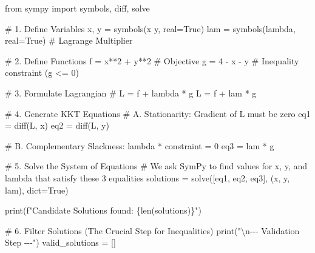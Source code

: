 \documentclass[
  letterpaper,
  DIV=11,
  numbers=noendperiod]{scrreprt}
\newenvironment{Shaded}{\begin{snugshade}}{\end{snugshade}}
\newcommand{\BuiltInTok}[1]{\textcolor[rgb]{0.00,0.23,0.31}{#1}}
\newcommand{\CharTok}[1]{\textcolor[rgb]{0.13,0.47,0.30}{#1}}
\newcommand{\CommentTok}[1]{\textcolor[rgb]{0.37,0.37,0.37}{#1}}
\newcommand{\DecValTok}[1]{\textcolor[rgb]{0.68,0.00,0.00}{#1}}
\newcommand{\ImportTok}[1]{\textcolor[rgb]{0.00,0.46,0.62}{#1}}
\newcommand{\NormalTok}[1]{\textcolor[rgb]{0.00,0.23,0.31}{#1}}
\newcommand{\OperatorTok}[1]{\textcolor[rgb]{0.37,0.37,0.37}{#1}}
\newcommand{\SpecialCharTok}[1]{\textcolor[rgb]{0.37,0.37,0.37}{#1}}
\newcommand{\SpecialStringTok}[1]{\textcolor[rgb]{0.13,0.47,0.30}{#1}}
\newcommand{\StringTok}[1]{\textcolor[rgb]{0.13,0.47,0.30}{#1}}
\newcommand{\VariableTok}[1]{\textcolor[rgb]{0.07,0.07,0.07}{#1}}
\begin{document}
\begin{Shaded}
\begin{Highlighting}[]
\ImportTok{from}\NormalTok{ sympy }\ImportTok{import}\NormalTok{ symbols, diff, solve}

\CommentTok{\# 1. Define Variables}
\NormalTok{x, y }\OperatorTok{=}\NormalTok{ symbols(}\StringTok{\textquotesingle{}x y\textquotesingle{}}\NormalTok{, real}\OperatorTok{=}\VariableTok{True}\NormalTok{)}
\NormalTok{lam }\OperatorTok{=}\NormalTok{ symbols(}\StringTok{\textquotesingle{}lambda\textquotesingle{}}\NormalTok{, real}\OperatorTok{=}\VariableTok{True}\NormalTok{) }\CommentTok{\# Lagrange Multiplier}

\CommentTok{\# 2. Define Functions}
\NormalTok{f }\OperatorTok{=}\NormalTok{ x}\OperatorTok{**}\DecValTok{2} \OperatorTok{+}\NormalTok{ y}\OperatorTok{**}\DecValTok{2}           \CommentTok{\# Objective}
\NormalTok{g }\OperatorTok{=} \DecValTok{4} \OperatorTok{{-}}\NormalTok{ x }\OperatorTok{{-}}\NormalTok{ y             }\CommentTok{\# Inequality constraint (g \textless{}= 0)}

\CommentTok{\# 3. Formulate Lagrangian}
\CommentTok{\# L = f + lambda * g}
\NormalTok{L }\OperatorTok{=}\NormalTok{ f }\OperatorTok{+}\NormalTok{ lam }\OperatorTok{*}\NormalTok{ g}

\CommentTok{\# 4. Generate KKT Equations}
\CommentTok{\# A. Stationarity: Gradient of L must be zero}
\NormalTok{eq1 }\OperatorTok{=}\NormalTok{ diff(L, x)}
\NormalTok{eq2 }\OperatorTok{=}\NormalTok{ diff(L, y)}

\CommentTok{\# B. Complementary Slackness: lambda * constraint = 0}
\NormalTok{eq3 }\OperatorTok{=}\NormalTok{ lam }\OperatorTok{*}\NormalTok{ g}

\CommentTok{\# 5. Solve the System of Equations}
\CommentTok{\# We ask SymPy to find values for x, y, and lambda that satisfy these 3 equalities}
\NormalTok{solutions }\OperatorTok{=}\NormalTok{ solve([eq1, eq2, eq3], (x, y, lam), }\BuiltInTok{dict}\OperatorTok{=}\VariableTok{True}\NormalTok{)}

\BuiltInTok{print}\NormalTok{(}\SpecialStringTok{f"Candidate Solutions found: }\SpecialCharTok{\{}\BuiltInTok{len}\NormalTok{(solutions)}\SpecialCharTok{\}}\SpecialStringTok{"}\NormalTok{)}

\CommentTok{\# 6. Filter Solutions (The Crucial Step for Inequalities)}
\BuiltInTok{print}\NormalTok{(}\StringTok{"}\CharTok{\textbackslash{}n}\StringTok{{-}{-}{-} Validation Step {-}{-}{-}"}\NormalTok{)}
\NormalTok{valid\_solutions }\OperatorTok{=}\NormalTok{ []}


\end{Highlighting}
\end{Shaded}
\end{document}
